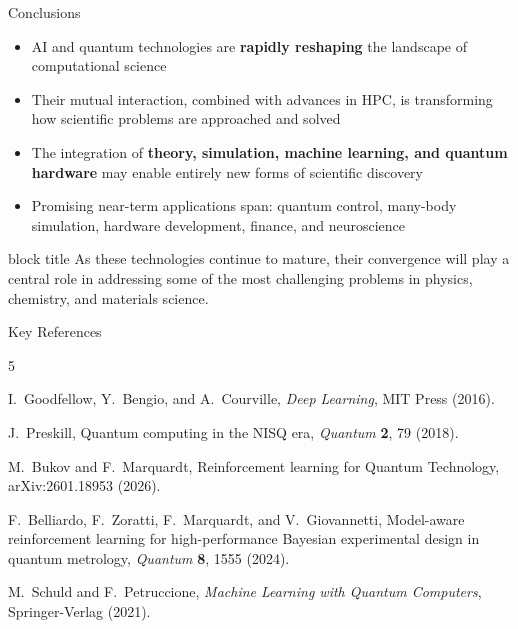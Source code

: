 \documentclass[aspectratio=169]{beamer}
\begin{document}
\begin{frame}{Conclusions}

  \begin{itemize}
    \setlength\itemsep{8pt}
    \item AI and quantum technologies are \textbf{rapidly reshaping}
          the landscape of computational science
    \medskip
    \item Their mutual interaction, combined with advances in HPC,
          is transforming how scientific problems are approached and solved
    \medskip
    \item The integration of \textbf{theory, simulation, machine learning,
          and quantum hardware} may enable entirely new forms of
          scientific discovery
    \medskip
    \item Promising near-term applications span:
          quantum control, many-body simulation, hardware development,
          finance, and neuroscience
  \end{itemize}

  \bigskip
  \begin{center}
    \begin{beamercolorbox}[rounded=true,sep=6pt,center,wd=0.88\linewidth]{block title}
      As these technologies continue to mature, their convergence
      will play a central role in addressing some of the most
      challenging problems in physics, chemistry, and materials science.
    \end{beamercolorbox}
  \end{center}

\end{frame}

\begin{frame}{Key References}

  \footnotesize
  \begin{thebibliography}{5}

    I.~Goodfellow, Y.~Bengio, and A.~Courville,
    \emph{Deep Learning},
    MIT Press (2016).

    J.~Preskill,
    Quantum computing in the NISQ era,
    \emph{Quantum} \textbf{2}, 79 (2018).

    M.~Bukov and F.~Marquardt,
    Reinforcement learning for Quantum Technology,
    arXiv:2601.18953 (2026).

    F.~Belliardo, F.~Zoratti, F.~Marquardt, and V.~Giovannetti,
    Model-aware reinforcement learning for high-performance
    Bayesian experimental design in quantum metrology,
    \emph{Quantum} \textbf{8}, 1555 (2024).

    M.~Schuld and F.~Petruccione,
    \emph{Machine Learning with Quantum Computers},
    Springer-Verlag (2021).

  \end{thebibliography}

\end{frame}
\end{document}
